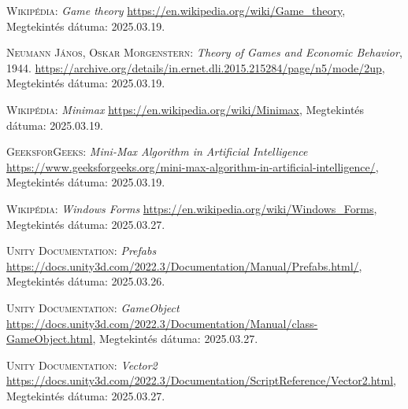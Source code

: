 \documentclass[
]{thesis-ekf}
\theoremstyle{definition}
\theoremstyle{remark}
\begin{document}
\begin{thebibliography}{2}
\textsc{Wikipédia:} \emph{Game theory} 
\url{https://en.wikipedia.org/wiki/Game_theory}, Megtekintés dátuma: 2025.03.19.

\textsc{Neumann János, Oskar Morgenstern}: \emph{Theory of Games and Economic Behavior}, 1944.
\url{https://archive.org/details/in.ernet.dli.2015.215284/page/n5/mode/2up}, Megtekintés dátuma: 2025.03.19.

\textsc{Wikipédia}: \emph{Minimax} 
\url{https://en.wikipedia.org/wiki/Minimax}, Megtekintés dátuma: 2025.03.19.

\textsc{GeeksforGeeks}: \emph{Mini-Max Algorithm in Artificial Intelligence} 
\url{https://www.geeksforgeeks.org/mini-max-algorithm-in-artificial-intelligence/}, Megtekintés dátuma: 2025.03.19.

\textsc{Wikipédia}: \emph{Windows Forms} 
\url{https://en.wikipedia.org/wiki/Windows_Forms}, Megtekintés dátuma: 2025.03.27.

\textsc{Unity Documentation}: \emph{Prefabs} 
\url{https://docs.unity3d.com/2022.3/Documentation/Manual/Prefabs.html/}, Megtekintés dátuma: 2025.03.26.

\textsc{Unity Documentation}: \emph{GameObject} 
\url{https://docs.unity3d.com/2022.3/Documentation/Manual/class-GameObject.html}, Megtekintés dátuma: 2025.03.27.

\textsc{Unity Documentation}: \emph{Vector2} 
\url{https://docs.unity3d.com/2022.3/Documentation/ScriptReference/Vector2.html}, Megtekintés dátuma: 2025.03.27.


\end{thebibliography}


\end{document}
